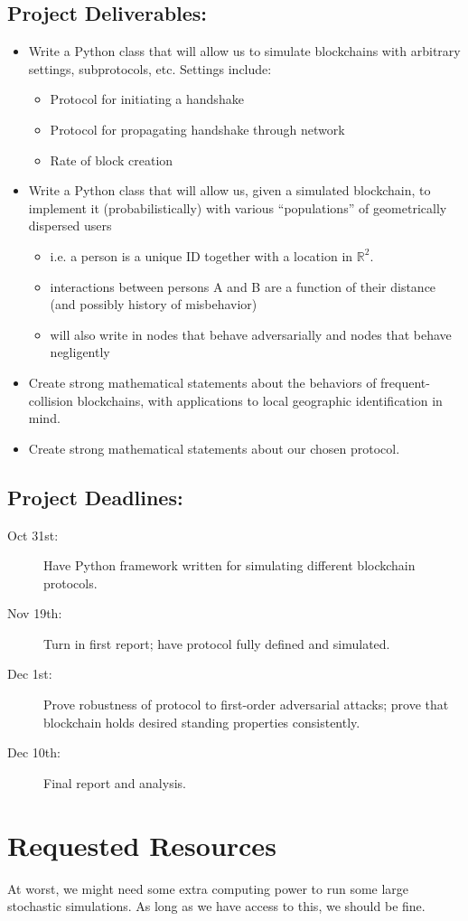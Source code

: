 \documentclass{article}
\begin{document}
\subsection*{Project Deliverables:}
\begin{itemize}
	\item Write a Python class that will allow us to simulate
		blockchains with arbitrary settings, subprotocols, etc.
		Settings include:
	\begin{itemize}
		\item Protocol for initiating a handshake
		\item Protocol for propagating handshake through network
		\item Rate of block creation
	\end{itemize}
	\item Write a Python class that will allow us, given a simulated
		blockchain, to implement it (probabilistically) with
		various ``populations'' of geometrically dispersed users
	\begin{itemize}
		\item i.e. a person is a unique ID
			together with a location in $\mathbb{R}^2$.
		\item interactions between persons A and B are
			a function of their distance (and possibly
			history of misbehavior)
		\item will also write in nodes that behave adversarially
			and nodes that behave negligently
	\end{itemize}
	\item Create strong mathematical statements about
		the behaviors of frequent-collision blockchains,
		with applications to local geographic identification
		in mind.
	\item Create strong mathematical statements about our chosen
		protocol.
\end{itemize}

\subsection*{Project Deadlines:}
\begin{description}
	\item[Oct 31st:] Have Python framework written for simulating different
		blockchain protocols.
	\item[Nov 19th:] Turn in first report; have protocol fully defined and
		simulated.
	\item[Dec 1st:] Prove robustness of protocol to first-order adversarial
		attacks; prove that blockchain holds desired standing properties
		consistently.
	\item[Dec 10th:] Final report and analysis.
\end{description}

\section*{Requested Resources}
At worst, we might need some extra computing power to run some large stochastic
simulations. As long as we have access to this, we should be fine.

\printbibliography[title={Bibliography}]
\end{document}
